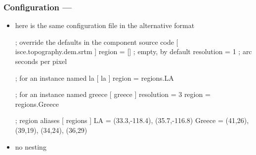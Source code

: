 \begin{frame}[fragile]
%
  \label{frame:srtm-cfg}
%
  \frametitle{Configuration --- }
%
  \begin{itemize}
%
    \item here is the same configuration file in the alternative  format
%
      \begin{icfg}[gobble=6]{}
        ; override the defaults in the component source code
        [ isce.topography.dem.srtm ]
        region = [] ; empty, by default
        resolution = 1 ; arc seconds per pixel

        ; for an instance named la
        [ la ]
        region = {regions.LA}

        ; for an instance named greece
        [ greece ]
        resolution = 3
        region = {regions.Greece}

        ; region aliases
        [ regions ]
        LA = (33.3,-118.4), (35.7,-116.8)
        Greece = (41,26), (39,19), (34,24), (36,29)
      \end{icfg}
%
    \item no nesting
%
  \end{itemize}
%
\end{frame}

